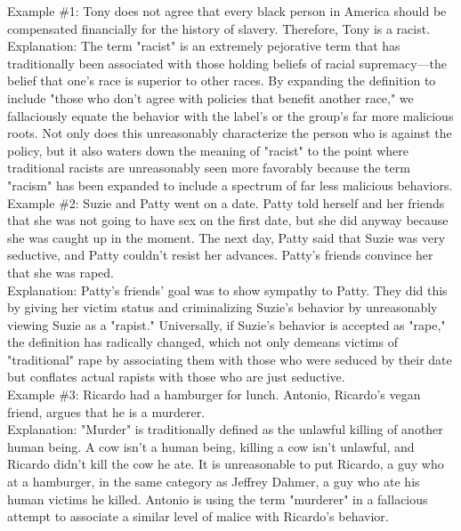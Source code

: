 \documentclass[a4paper,12pt,single,pdftex]{scrbook}
\begin{document}
    
      Example \#1: Tony does not agree that every black person in America should be compensated financially for the history of slavery. Therefore, Tony is a racist.
    \\

    
      Explanation: The term "racist" is an extremely pejorative term that has traditionally been associated with those holding beliefs of racial supremacy—the belief that one's race is superior to other races. By expanding the definition to include "those who don't agree with policies that benefit another race," we fallaciously equate the behavior with the label's or the group's far more malicious roots. Not only does this unreasonably characterize the person who is against the policy, but it also waters down the meaning of "racist" to the point where traditional racists are unreasonably seen more favorably because the term "racism" has been expanded to include a spectrum of far less malicious behaviors.
    \\

    
      Example \#2: Suzie and Patty went on a date. Patty told herself and her friends that she was not going to have sex on the first date, but she did anyway because she was caught up in the moment. The next day, Patty said that Suzie was very seductive, and Patty couldn't resist her advances. Patty's friends convince her that she was raped.
    \\

    
      Explanation: Patty's friends' goal was to show sympathy to Patty. They did this by giving her victim status and criminalizing Suzie's behavior by unreasonably viewing Suzie as a "rapist." Universally, if Suzie's behavior is accepted as "rape," the definition has radically changed, which not only demeans victims of "traditional" rape by associating them with those who were seduced by their date but conflates actual rapists with those who are just seductive.
    \\

    
      Example \#3: Ricardo had a hamburger for lunch. Antonio, Ricardo's vegan friend, argues that he is a murderer.
    \\

    
      Explanation: "Murder" is traditionally defined as the unlawful killing of another human being. A cow isn't a human being, killing a cow isn't unlawful, and Ricardo didn't kill the cow he ate. It is unreasonable to put Ricardo, a guy who at a hamburger, in the same category as Jeffrey Dahmer, a guy who ate his human victims he killed. Antonio is using the term "murderer" in a fallacious attempt to associate a similar level of malice with Ricardo's behavior.
    \\
\end{document}
